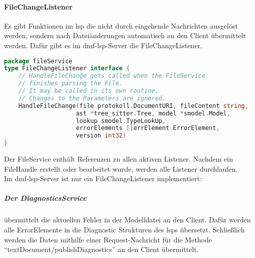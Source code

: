 \documentclass[./einleitung.tex]{subfiles}
\begin{document}
    \paragraph{FileChangeListener}
    Es gibt Funktionen im \acrshort{lsp} die nicht durch eingehende Nachrichten ausgelöst werden, sondern nach Dateiänderungen automatisch an den Client übermittelt werden.
    Dafür gibt es im \acrshort{dmf}-\acrshort{lsp}-Server die FileChangeListener.
    \begin{lstlisting}[language=Go]
package fileService
type FileChangeListener interface {
	// HandleFileChange gets called when the FileService
    // finishes parsing the File.
    // It may be called in its own routine.
    // Changes to the Parameters are ignored.
	HandleFileChange(file protokoll.DocumentURI, fileContent string,
                    ast *tree_sitter.Tree, model *smodel.Model,
                    lookup smodel.TypeLookUp,
                    errorElements []errElement.ErrorElement,
                    version int32)
}
    \end{lstlisting}
    Der FileService enthält Referenzen zu allen aktiven Listener.
    Nachdem ein FileHandle erstellt oder bearbeitet wurde, werden alle Listener durchlaufen.\\
    Im \acrshort{dmf}-\acrshort{lsp}-Server ist nur ein FileChangeListener implementiert:
    \subparagraph{Der DiagnosticsService}
    übermittelt die aktuellen Fehler in der Modelldatei an den Client.
    Dafür werden alle ErrorElemente in die Diagnostic Strukturen des \acrshort{lsp}s übersetzt.
    Schließlich werden die Daten mithilfe einer Request-Nachricht für die Methode ``textDocument/publishDiagnostics'' an den Client übermittelt.
\end{document}
